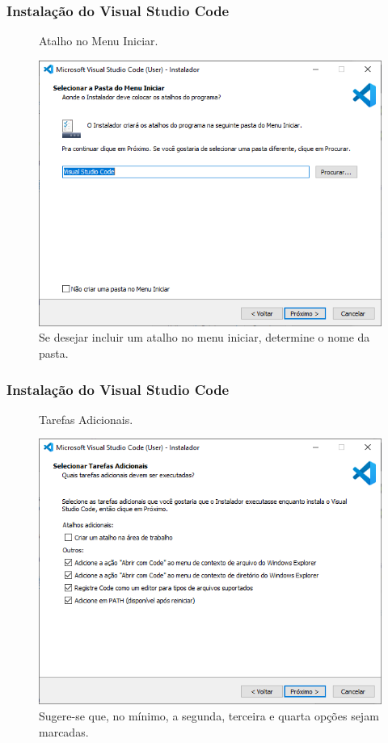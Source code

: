 \documentclass{beamer}
\begin{document}
\begin{frame}
    \frametitle{Instalação do Visual Studio Code}
\begin{figure}[h]
    \centering
    \caption{Atalho no Menu Iniciar.}
    \label{fig:atalho_menu_iniciar}
    \includegraphics[width=0.8\textheight]{../images/atalho_menu_iniciar.png}
    \caption*{\footnotesize Se desejar incluir um atalho no menu iniciar, determine o nome da pasta.}
\end{figure}
\end{frame}

\begin{frame}
    \frametitle{Instalação do Visual Studio Code}
\begin{figure}[h]
    \centering
    \caption{Tarefas Adicionais.}
    \label{fig:tarefas_adicionais}
    \includegraphics[width=0.8\textheight]{../images/tarefas adicionais.png}
    \caption*{\footnotesize Sugere-se que, no mínimo, a segunda, terceira e quarta opções sejam marcadas.}
\end{figure}
\end{frame}
\end{document}
